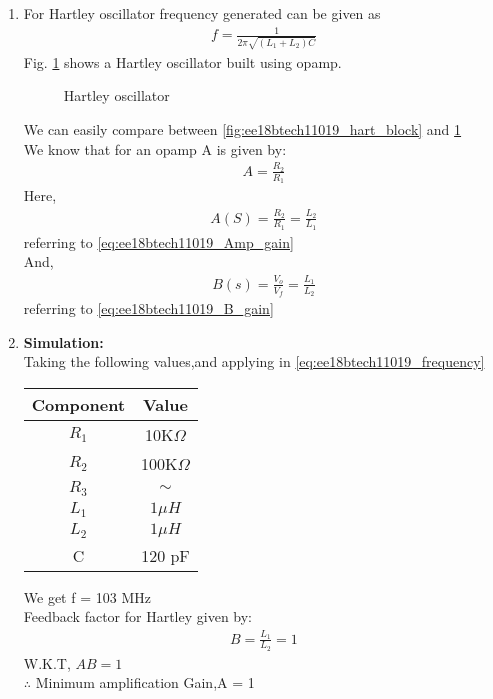 \begin{enumerate}[label=\thesection.\arabic*.,ref=\thesection.\theenumi]
\item For Hartley oscillator frequency generated can be given as 
\begin{align}
    f = \frac{1}{2\pi\sqrt{(L_1 + L_2)C}}
    \label{eq:ee18btech11019_frequency}
\end{align}
Fig. \ref{fig:ee18btech11019_hart} shows a
Hartley oscillator built using opamp.\\

\begin{figure}[ht]
    \begin{center}
	    \resizebox{\columnwidth}{!}{}
	\end{center}
\caption{Hartley oscillator}
\label{fig:ee18btech11019_hart}
\end{figure}
We can easily compare between \ref{fig:ee18btech11019_hart_block} and \ref{fig:ee18btech11019_hart}\\
We know that for an opamp A is given by:
\begin{align}
    A = \frac{R_2}{R_1}
\end{align}
Here,
\begin{align}
    A(S) = \frac{R_2}{R_1} = \frac{L_2}{L_1}
\end{align}
referring to \ref{eq:ee18btech11019_Amp_gain}\\
And,
\begin{align}
    B(s) = \frac{V_o}{V_f} = \frac{L_1}{L_2}
\end{align}
referring to \ref{eq:ee18btech11019_B_gain}\\
\newline
\item \textbf{Simulation:}\\
Taking the following values,and applying in \ref{eq:ee18btech11019_frequency} \\



\begin{tabular}{|c|c|}
\hline
Component & Value  \\
\hline
$R_1$         & 10K$\Omega$   \\
\hline
$R_2$         & 100K$\Omega$   \\
\hline
$R_3$         & $\sim$  \\
\hline
$L_1$         & $1 \mu H$     \\
\hline
$L_2$         & $1 \mu H$   \\
\hline
C         & 120 pF \\
\hline
\end{tabular}


We get f = 103 MHz\\
Feedback factor for Hartley given by:
\begin{align}
B =\frac{L_1}{L_2}= 1
\end{align}
W.K.T, $AB = 1$\\
$\therefore$ Minimum amplification Gain,A = 1\\
\end{enumerate}
